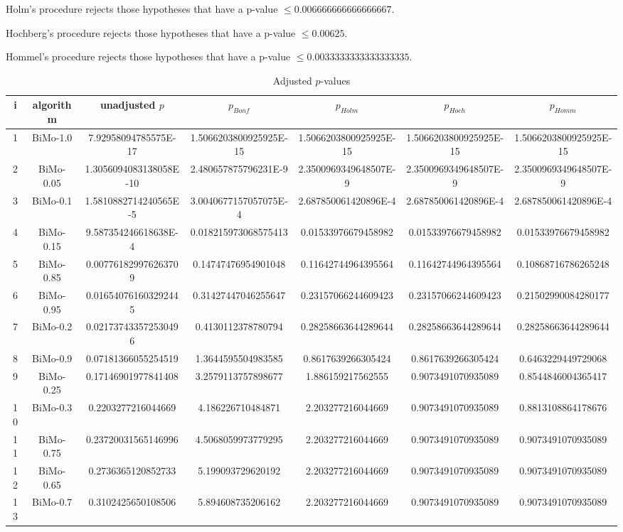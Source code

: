 \documentclass[a4paper,10pt]{article}
\begin{document}
\begin{landscape}
Holm's procedure rejects those hypotheses that have a p-value $\le0.006666666666666667$.


Hochberg's procedure rejects those hypotheses that have a p-value $\le0.00625$.


Hommel's procedure rejects those hypotheses that have a p-value $\le0.0033333333333333335$.


\begin{table}[!htp]
\centering\tiny
\caption{Adjusted $p$-values}
\begin{tabular}{ccccccc}
i&algorithm&unadjusted $p$&$p_{Bonf}$&$p_{Holm}$&$p_{Hoch}$&$p_{Homm}$\\
\hline
1&BiMo-1.0&7.92958094785575E-17&1.5066203800925925E-15&1.5066203800925925E-15&1.5066203800925925E-15&1.5066203800925925E-15\\
2&BiMo-0.05&1.3056094083138058E-10&2.480657875796231E-9&2.3500969349648507E-9&2.3500969349648507E-9&2.3500969349648507E-9\\
3&BiMo-0.1&1.5810882714240565E-5&3.0040677157057075E-4&2.687850061420896E-4&2.687850061420896E-4&2.687850061420896E-4\\
4&BiMo-0.15&9.587354246618638E-4&0.018215973068575413&0.01533976679458982&0.01533976679458982&0.01533976679458982\\
5&BiMo-0.85&0.007761829976263709&0.14747476954901048&0.11642744964395564&0.11642744964395564&0.10868716786265248\\
6&BiMo-0.95&0.016540761603292445&0.31427447046255647&0.23157066244609423&0.23157066244609423&0.21502990084280177\\
7&BiMo-0.2&0.021737433572530496&0.4130112378780794&0.28258663644289644&0.28258663644289644&0.28258663644289644\\
8&BiMo-0.9&0.07181366055254519&1.3644595504983585&0.8617639266305424&0.8617639266305424&0.6463229449729068\\
9&BiMo-0.25&0.17146901977841408&3.2579113757898677&1.886159217562555&0.9073491070935089&0.8544846004365417\\
10&BiMo-0.3&0.2203277216044669&4.186226710484871&2.203277216044669&0.9073491070935089&0.8813108864178676\\
11&BiMo-0.75&0.23720031565146996&4.5068059973779295&2.203277216044669&0.9073491070935089&0.9073491070935089\\
12&BiMo-0.65&0.2736365120852733&5.199093729620192&2.203277216044669&0.9073491070935089&0.9073491070935089\\
13&BiMo-0.7&0.3102425650108506&5.894608735206162&2.203277216044669&0.9073491070935089&0.9073491070935089\\

\end{tabular}
\end{table}
\end{landscape}
\end{document}

